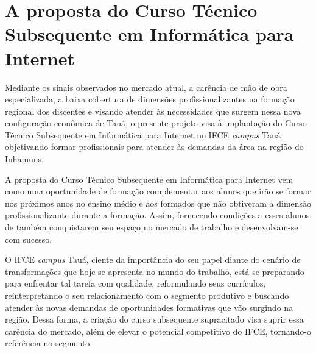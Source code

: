 \section{A proposta do Curso Técnico Subsequente em Informática para Internet}

Mediante os sinais observados no mercado atual, a carência de mão de obra especializada, a baixa cobertura de dimensões profissionalizantes na formação regional dos discentes e visando atender às necessidades que surgem nessa nova configuração econômica de Tauá, o presente projeto visa \`a implantação do Curso Técnico Subsequente em Informática para Internet no IFCE  
\textit{campus} Tauá objetivando formar profissionais para atender às demandas da área na região do Inhamuns.

A proposta do Curso Técnico Subsequente em Informática para Internet vem como
uma oportunidade de formação complementar aos alunos que irão se formar nos
próximos anos no ensino médio e aos formados que não obtiveram a dimensão
profissionalizante durante a formação. Assim, fornecendo condições a esses
alunos de também conquistarem seu espaço no mercado de trabalho e desenvolvam-se
com sucesso.


O IFCE \textit{campus} Tauá, ciente da importância do seu papel diante do
cenário de transformações que hoje se apresenta no mundo do trabalho, está se
preparando para enfrentar tal tarefa com qualidade, reformulando seus
currículos, reinterpretando o seu relacionamento com o segmento produtivo e
buscando atender às novas demandas de oportunidades formativas que vão surgindo
na região. Dessa forma, a criação do curso subsequente supracitado visa suprir
essa carência do mercado, além de elevar o potencial competitivo do IFCE,
tornando-o referência no segmento.




